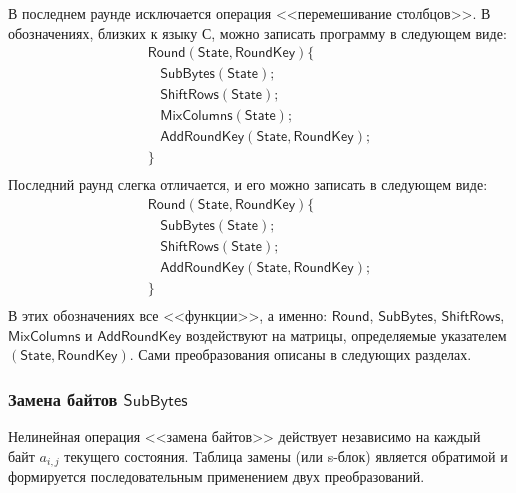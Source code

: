 В последнем раунде исключается операция <<перемешивание столбцов>>. В обозначениях, близких к языку С, можно записать программу в следующем виде:
\[
    \begin{array}{l}
        \mathsf{Round(State, RoundKey)} \{ \\
        ~~~~ \mathsf{SubBytes(State)}; \\
        ~~~~ \mathsf{ShiftRows(State)}; \\
        ~~~~ \mathsf{MixColumns(State)}; \\
        ~~~~ \mathsf{AddRoundKey(State, RoundKey)}; \\
        \} \\
    \end{array}
\]
Последний раунд слегка отличается, и его можно записать в следующем виде:
\[
    \begin{array}{l}
        \mathsf{Round(State, RoundKey)} \{ \\
        ~~~~ \mathsf{SubBytes(State)}; \\
        ~~~~ \mathsf{ShiftRows(State)}; \\
        ~~~~ \mathsf{AddRoundKey(State, RoundKey)}; \\
        \} \\
    \end{array}
\]
В этих обозначениях все <<функции>>, а именно: $\mathsf{Round}$, $\mathsf{SubBytes}$, $\mathsf{ShiftRows}$, $\mathsf{MixColumns}$ и $\mathsf{AddRoundKey}$ воздействуют на матрицы, определяемые указателем $\mathsf{(State, RoundKey)}$. Сами преобразования описаны в следующих разделах.


\subsubsection{Замена байтов $\mathsf{SubBytes}$}

Нелинейная операция <<замена байтов>> действует независимо на каждый байт $a_{i,j}$ текущего состояния. Таблица замены (или s-блок) является обратимой и формируется последовательным применением двух преобразований.

